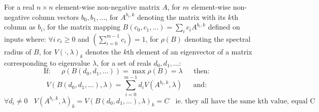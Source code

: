 \begin{Theorem}\label{th:4}
For a real $n\times n$ element-wise non-negative matrix $A$, 
for $m$ element-wise non-negative column vectors $b_0,b_1,\dots$, 
for $A^{b_i,k}$ denoting the matrix with its $k$th column as $b_i$, 
for the matrix mapping $B(c_0,c_1,\dots) = \sum_{i}c_iA^{b_i,k}$ defined on inputs where: $\forall i~c_i\ge 0$ and $\left(\sum_{i=0}^{m-1}c_i\right)=1$, 
for $\rho(B)$ denoting the spectral radius of $B$, 
for $V(\cdot,\lambda)_k$ denotes the $k$th element of an eigenvector of a matrix corresponding to eigenvalue $\lambda$, 
for a set of reals $d_0,d_1,\dots$: 
$$\text{If:}~~~~~~~\rho(B(d_0,d_1,\dots)) = \max\rho(B)=\lambda ~~~~~~~\text{then:}~~~~~~~ $$ 
$$ V(B(d_0,d_1,\dots),\lambda) = \sum_{i=0}^{m-1}d_iV(A^{b_i,k},\lambda) ~~~~~~~\text{and:}~~~~~~~ $$
$$ \forall d_i\ne 0~~~~ V(A^{b_i,k},\lambda)_k=V(B(d_0,d_1,\dots),\lambda)_k=C  ~~~~\text{ie. they all have the same kth value, equal C}$$
\end{Theorem}
